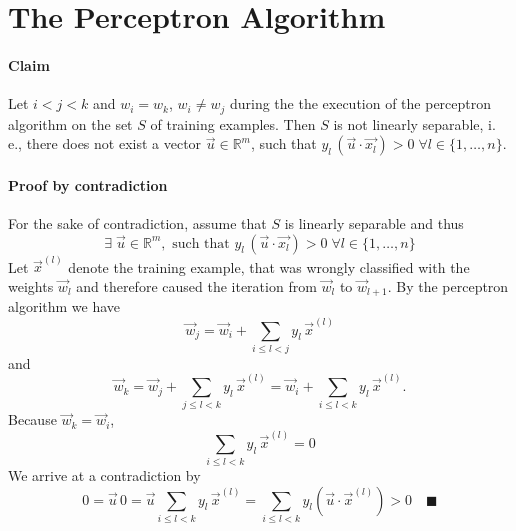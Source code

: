 \section{The Perceptron Algorithm}

\paragraph{Claim}

Let $i<j<k$ and $w_{i}=w_{k}$, $w_{i}\neq w_{j}$ during the the
execution of the perceptron algorithm on the set $S$ of training
examples. Then $S$ is not linearly separable, i.\,e., there does
not exist a vector $\vec{u}\in\mathbb{R}^{m}$, such that $y_{l}\,(\vec{u}\cdot\vec{x_{l}})>0\;\forall l\in\{1,\ldots,n\}$.


\paragraph{Proof by contradiction}

For the sake of contradiction, assume that $S$ is linearly separable
and thus
\[
\exists\;\vec{u}\in\mathbb{R}^{m},\text{ such that }y_{l}\,(\vec{u}\cdot\vec{x_{l}})>0\;\forall l\in\{1,\ldots,n\}
\]
Let $\vec{x}^{(l)}$ denote the training example, that was wrongly
classified with the weights $\vec{w}_{l}$ and therefore caused the
iteration from $\vec{w}_{l}$ to $\vec{w}_{l+1}$. By the perceptron
algorithm we have
\[
\vec{w}_{j}=\vec{w}_{i}+\sum_{i\leq l<j}y_{l}\,\vec{x}^{(l)}
\]
and
\[
\vec{w}_{k}=\vec{w}_{j}+\sum_{j\leq l<k}y_{l}\,\vec{x}^{(l)}=\vec{w}_{i}+\sum_{i\leq l<k}y_{l}\,\vec{x}^{(l)}.
\]
Because $\vec{w}_{k}=\vec{w}_{i}$,
\[
\sum_{i\leq l<k}y_{l}\,\vec{x}^{(l)}=0
\]
We arrive at a contradiction by
\[
0=\vec{u}\,0=\vec{u}\sum_{i\leq l<k}y_{l}\,\vec{x}^{(l)}=\sum_{i\leq l<k}y_{l}\left(\vec{u}\cdot\vec{x}^{(l)}\right)>0\quad\blacksquare
\]